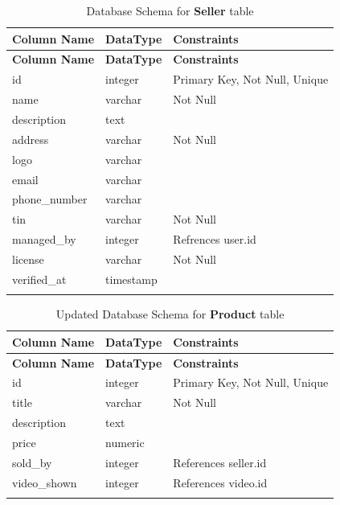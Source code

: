 \documentclass[12pt]{report}
\begin{document}
\begin{longtable}[H]{|l|l|p{6.5cm}||}
	\hline
	\textbf{Column Name} & \textbf{DataType} & \textbf{Constraints}          \\
	\hline
	\endfirsthead
	\hline
	\textbf{Column Name} & \textbf{DataType} & \textbf{Constraints}          \\
	\hline
	\endhead
	id                   & integer           & Primary Key, Not Null, Unique \\
	\hline
	name                 & varchar           & Not Null                      \\
	\hline
	description          & text              &                               \\
	\hline
	address              & varchar           & Not Null                      \\
	\hline
	logo                 & varchar           &                               \\
	\hline
	email                & varchar           &                               \\
	\hline
	phone\_number        & varchar           &                               \\
	\hline
	tin                  & varchar           & Not Null                      \\
	\hline
	managed\_by          & integer           & Refrences user.id             \\
	\hline
	license              & varchar           & Not Null                      \\
	\hline
	verified\_at         & timestamp         &                               \\
	\hline
	\hline
	\caption{Database Schema for \textbf{Seller} table}\label{tab:tableseller}
\end{longtable}

\begin{longtable}[H]{|l|l|p{6.5cm}||}
	\hline
	\textbf{Column Name} & \textbf{DataType} & \textbf{Constraints}          \\
	\hline
	\endfirsthead
	\hline
	\textbf{Column Name} & \textbf{DataType} & \textbf{Constraints}          \\
	\hline
	\endhead
	id                   & integer           & Primary Key, Not Null, Unique \\
	\hline
	title                & varchar           & Not Null                      \\
	\hline
	description          & text              &                               \\
	\hline
	price                & numeric           &                               \\
	\hline
	sold\_by             & integer           & References seller.id          \\
	\hline
	video\_shown         & integer           & References video.id           \\
	\hline
	\hline
	\caption{Updated Database Schema for \textbf{Product} table}\label{tab:tableUpdatedProduct}
\end{longtable}
\end{document}
